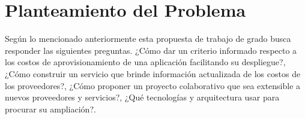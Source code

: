 
\chapter{Planteamiento del Problema} %

\label{ch:problema} %



Según lo mencionado anteriormente esta propuesta de trabajo de grado busca responder las siguientes preguntas. ¿Cómo dar un criterio informado respecto a los costos de aprovisionamiento de una aplicación facilitando su despliegue?, ¿Cómo construir un servicio que brinde información actualizada de los costos de los proveedores?, ¿Cómo proponer un proyecto colaborativo que sea extensible a nuevos proveedores y servicios?, ¿Qué tecnologías y arquitectura usar para procurar su ampliación?.\bigskip

